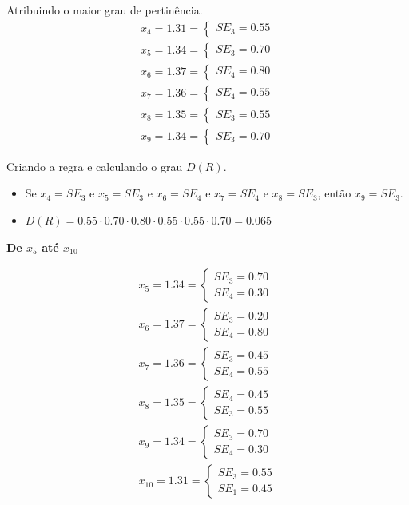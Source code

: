 \documentclass[12pt]{article}
\begin{document}
Atribuindo o maior grau de pertinência.
\begin{align*}
	x_4=1.31=\begin{cases}
		SE_3=0.55
	\end{cases}\\
	x_5=1.34=\begin{cases}
		SE_3=0.70
	\end{cases}\\
	x_6=1.37=\begin{cases}
		SE_4=0.80
	\end{cases}\\
	x_7=1.36=\begin{cases}
		SE_4=0.55
	\end{cases}\\
	x_8=1.35=\begin{cases}
		SE_3=0.55
	\end{cases}\\
	x_9=1.34=\begin{cases}
		SE_3=0.70
	\end{cases}
\end{align*}

Criando a regra e calculando o grau $D(R)$.
\begin{itemize}
	\item Se $x_4=SE_3$ e $x_5=SE_3$ e $x_6=SE_4$ e $x_7=SE_4$ e $x_8=SE_3$, então $x_9=SE_3$.
	\item $D(R)=0.55\cdot0.70\cdot0.80\cdot0.55\cdot0.55\cdot0.70=0.065$
\end{itemize}

\textbf{De $x_5$ até $x_{10}$}

\begin{align*}
	x_5=1.34=\begin{cases}
		SE_3=0.70\\SE_4=0.30
	\end{cases}\\
	x_6=1.37=\begin{cases}
		SE_3=0.20\\SE_4=0.80
	\end{cases}\\
	x_7=1.36=\begin{cases}
		SE_3=0.45\\SE_4=0.55
	\end{cases}\\
	x_8=1.35=\begin{cases}
		SE_4=0.45\\SE_3=0.55
	\end{cases}\\
	x_9=1.34=\begin{cases}
		SE_3=0.70\\SE_4=0.30
	\end{cases}\\
	x_{10}=1.31=\begin{cases}
		SE_3=0.55\\SE_1=0.45
	\end{cases}
\end{align*}
\end{document}
